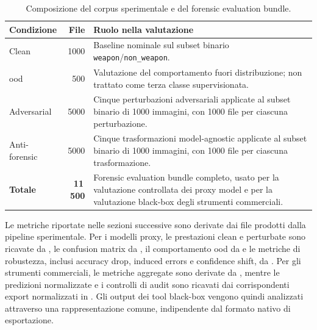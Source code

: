 \begin{table}[H]
\centering
\caption{Composizione del corpus sperimentale e del forensic evaluation bundle.}
\label{tab:results-corpus-composition}
\begin{tabularx}{0.90\textwidth}{@{}l r X@{}}
\toprule
\textbf{Condizione} & \textbf{File} & \textbf{Ruolo nella valutazione} \\
\midrule

Clean
&
1000
&
Baseline nominale sul subset binario \texttt{weapon}/\texttt{non\_weapon}. \\

\gls{ood}
&
500
&
Valutazione del comportamento fuori distribuzione; non trattato come terza
classe supervisionata. \\

Adversarial
&
5000
&
Cinque perturbazioni adversariali applicate al subset binario di 1000 immagini,
con 1000 file per ciascuna perturbazione. \\


Anti-forensic
&
5000
&
Cinque trasformazioni model-agnostic applicate al subset binario di 1000
immagini, con 1000 file per ciascuna trasformazione. \\

\midrule
\textbf{Totale}
&
\textbf{11\,500}
&
Forensic evaluation bundle completo, usato per la valutazione controllata dei
proxy model e per la valutazione black-box degli strumenti commerciali. \\

\bottomrule
\end{tabularx}
\end{table}

Le metriche riportate nelle sezioni successive sono derivate dai file prodotti
dalla pipeline sperimentale. Per i modelli proxy, le prestazioni clean e
perturbate sono ricavate da ,
le confusion matrix da
, il comportamento
\gls{ood} da  e le metriche di
robustezza, inclusi accuracy drop, induced errors e confidence shift, da
. Per gli strumenti commerciali,
le metriche aggregate sono derivate da ,
mentre le predizioni normalizzate e i controlli di audit sono ricavati dai corrispondenti export
normalizzati in . Gli output dei tool
black-box vengono quindi analizzati attraverso una rappresentazione comune,
indipendente dal formato nativo di esportazione.

